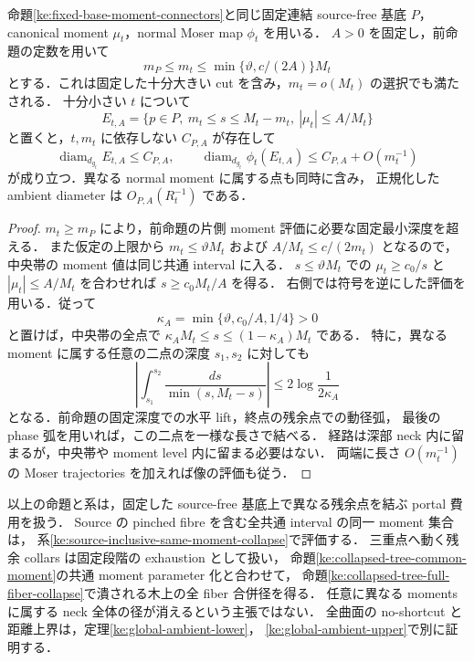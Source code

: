\begin{corollary}
\label{ke:fixed-base-central-band}
命題\ref{ke:fixed-base-moment-connectors}と同じ固定連結 source-free 基底 $P$，
canonical moment $\mu_t$，normal Moser map $\phi_t$ を用いる．
$A>0$ を固定し，前命題の定数を用いて
\[
 m_P\le m_t\le\min\{\vartheta,c/(2A)\}M_t
\]
とする．これは固定した十分大きい cut を含み，$m_t=o(M_t)$ の選択でも満たされる．
十分小さい $t$ について
\[
 E_{t,A}=\{p\in P,\ m_t\le s\le M_t-m_t,\ |\mu_t|\le A/M_t\}
\]
と置くと，$t,m_t$ に依存しない $C_{P,A}$ が存在して
\[
 \operatorname{diam}_{d_{g_t}}E_{t,A}\le C_{P,A},\qquad
 \operatorname{diam}_{d_{g_t}}\phi_t(E_{t,A})
 \le C_{P,A}+O(m_t^{-1})
\]
が成り立つ．異なる normal moment に属する点も同時に含み，
正規化した ambient diameter は $O_{P,A}(R_t^{-1})$ である．
\end{corollary}

\begin{proof}
$m_t\ge m_P$ により，前命題の片側 moment 評価に必要な固定最小深度を超える．
また仮定の上限から $m_t\le\vartheta M_t$ および $A/M_t\le c/(2m_t)$ となるので，
中央帯の moment 値は同じ共通 interval に入る．
$s\le\vartheta M_t$ での $\mu_t\ge c_0/s$ と
$|\mu_t|\le A/M_t$ を合わせれば $s\ge c_0M_t/A$ を得る．
右側では符号を逆にした評価を用いる．従って
\[
 \kappa_A=\min\{\vartheta,c_0/A,1/4\}>0
\]
と置けば，中央帯の全点で
$\kappa_A M_t\le s\le(1-\kappa_A)M_t$ である．
特に，異なる moment に属する任意の二点の深度 $s_1,s_2$ に対しても
\[
 \left|\int_{s_1}^{s_2}\frac{ds}{\min(s,M_t-s)}\right|
 \le 2\log\frac{1}{2\kappa_A}
\]
となる．前命題の固定深度での水平 lift，終点の残余点での動径弧，
最後の phase 弧を用いれば，この二点を一様な長さで結べる．
経路は深部 neck 内に留まるが，中央帯や moment level 内に留まる必要はない．
両端に長さ $O(m_t^{-1})$ の Moser trajectories を加えれば像の評価も従う．
\end{proof}

以上の命題と系は，固定した source-free 基底上で異なる残余点を結ぶ portal 費用を扱う．
Source の pinched fibre を含む全共通 interval の同一 moment 集合は，
系\ref{ke:source-inclusive-same-moment-collapse}で評価する．
三重点へ動く残余 collars は固定段階の exhaustion として扱い，
命題\ref{ke:collapsed-tree-common-moment}の共通 moment parameter 化と合わせて，
命題\ref{ke:collapsed-tree-full-fiber-collapse}で潰される木上の全 fiber 合併径を得る．
任意に異なる moments に属する neck 全体の径が消えるという主張ではない．
全曲面の no-shortcut と距離上界は，定理\ref{ke:global-ambient-lower}，
\ref{ke:global-ambient-upper}で別に証明する．

